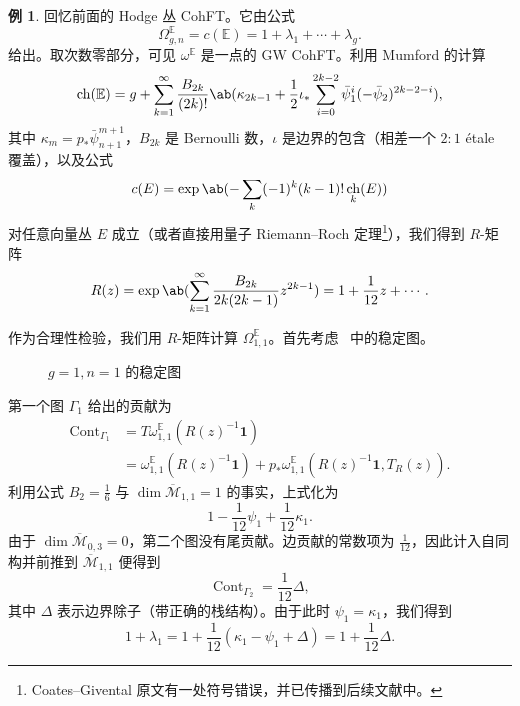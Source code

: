 \documentclass{amsart}
\theoremstyle{definition}
\newtheorem{exm}[thm]{例}
\theoremstyle{remark}
\theoremstyle{plain}
\theoremstyle{definition}
\theoremstyle{remark}
\newcommand{\E}{\mathbb{E}}
\newcommand{\Mbar}{\overline{\mathcal{M}}}
\newcommand{\1}{\mathbf{1}}
\newcommand{\2}{\mathbf{2}}
\newcommand{\3}{\mathbf{3}}
\DeclareMathOperator{\ch}{ch}
\DeclareMathOperator{\Cont}{Cont}
\begin{document}
\begin{exm}
    回忆前面的 Hodge 丛 CohFT。它由公式
    \[ \Omega^{\E}_{g,n} = c(\E) = 1 + \lambda_1 + \cdots + \lambda_g. \]
    给出。取次数零部分，可见 $\omega^{\E}$ 是一点的 GW CohFT。利用 Mumford 的计算
    \[ \ch(\E) = g + \sum_{k=1}^{\infty} \frac{B_{2k}}{(2k)!}\ab(\kappa_{2k-1} + \frac{1}{2}\iota_*\sum_{i=0}^{2k-2} \bar{\psi}_1^{i} (-\bar{\psi}_2)^{2k-2-i}), \]
    其中 $\kappa_{m} = p_* \bar{\psi}_{n+1}^{m+1}$，$B_{2k}$ 是 Bernoulli 数，$\iota$ 是边界的包含（相差一个 $2:1$ \'etale 覆盖），以及公式
    \[ c(E) = \exp \ab(-\sum_k (-1)^k (k-1)!\ch_k(E)) \]
    对任意向量丛 $E$ 成立（或者直接用量子 Riemann--Roch 定理\footnote{Coates--Givental 原文有一处符号错误，并已传播到后续文献中。}），我们得到 $R$-矩阵
    \[ R(z) = \exp\ab( \sum_{k=1}^{\infty} \frac{B_{2k}}{2k(2k-1)} z^{2k-1}) = 1+\frac{1}{12}z + \cdots. \]

    作为合理性检验，我们用 $R$-矩阵计算 $\Omega_{1,1}^{\E}$。首先考虑~ 中的稳定图。
    \begin{figure}[htpb]
    \begin{center}
    \end{center}
    \caption{$g=1, n=1$ 的稳定图}%
    \label{fig:03graphloop}
    \end{figure}
    第一个图 $\Gamma_1$ 给出的贡献为
    \begin{align*}
        \Cont_{\Gamma_1} &= T\omega_{1,1}^{\E}(R(z)^{-1}\1) \\
        &= \omega_{1,1}^{\E}(R(z)^{-1}\1) + p_* \omega_{1,1}^{\E}(R(z)^{-1}\1, T_R(z)).
    \end{align*}
    利用公式 $B_2 = \frac{1}{6}$ 与 $\dim \Mbar_{1,1} = 1$ 的事实，上式化为
    \[ 1 - \frac{1}{12}\psi_1 + \frac{1}{12} \kappa_1. \]
    由于 $\dim \Mbar_{0,3} = 0$，第二个图没有尾贡献。边贡献的常数项为 $\frac{1}{12}$，因此计入自同构并前推到 $\Mbar_{1,1}$ 便得到
    \[ \Cont_{\Gamma_2} = \frac{1}{12} \Delta, \]
    其中 $\Delta$ 表示边界除子（带正确的栈结构）。由于此时 $\psi_1 = \kappa_1$，我们得到
    \[ 1+\lambda_1 = 1 + \frac{1}{12}(\kappa_1 - \psi_1 + \Delta) = 1 + \frac{1}{12} \Delta. \]
\end{exm}
\end{document}
